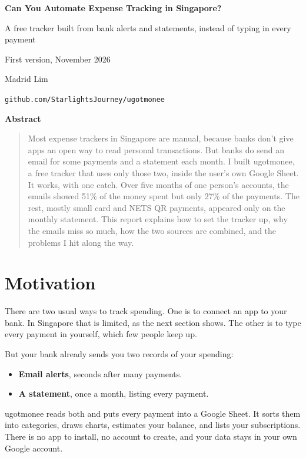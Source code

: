 \documentclass[10pt]{article}
\begin{document}
\begin{center}
  {\LARGE\bfseries Can You Automate Expense Tracking in Singapore?\par}
  \vspace{6pt}
  {\large A free tracker built from bank alerts and statements, instead of typing in every payment\par}
  \vspace{4pt}
  {\small First version, November 2026\par}
  \vspace{14pt}
  {\large Madrid Lim\par}
  \vspace{2pt}
  {\small \texttt{github.com/StarlightsJourney/ugotmonee}\par}
\end{center}

\vspace{6pt}
\begin{center}\textbf{Abstract}\end{center}
\vspace{-6pt}
\begin{quote}
Most expense trackers in Singapore are manual, because banks don't give apps an open way to read personal transactions. But banks do send an email for some payments and a statement each month. I built ugotmonee, a free tracker that uses only those two, inside the user's own Google Sheet. It works, with one catch. Over five months of one person's accounts, the emails showed 51\% of the money spent but only 27\% of the payments. The rest, mostly small card and NETS QR payments, appeared only on the monthly statement. This report explains how to set the tracker up, why the emails miss so much, how the two sources are combined, and the problems I hit along the way.
\end{quote}

\section{Motivation}

There are two usual ways to track spending. One is to connect an app to your bank. In Singapore that is limited, as the next section shows. The other is to type every payment in yourself, which few people keep up.

But your bank already sends you two records of your spending:
\begin{itemize}
  \item \textbf{Email alerts}, seconds after many payments.
  \item \textbf{A statement}, once a month, listing every payment.
\end{itemize}
ugotmonee reads both and puts every payment into a Google Sheet. It sorts them into categories, draws charts, estimates your balance, and lists your subscriptions. There is no app to install, no account to create, and your data stays in your own Google account.
\end{document}
